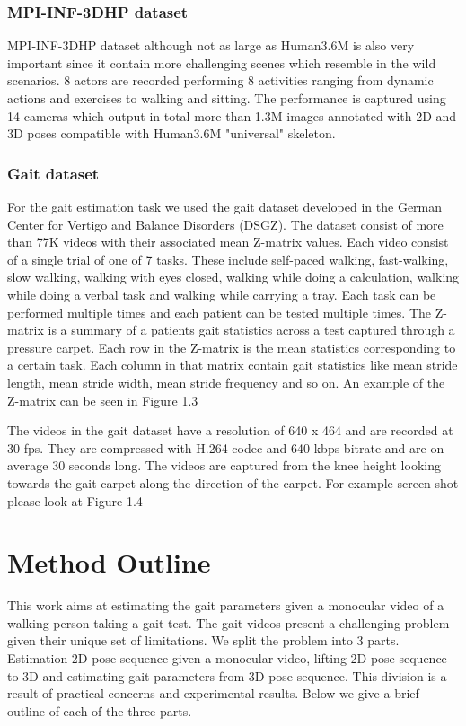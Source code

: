 \subsubsection{MPI-INF-3DHP dataset}

MPI-INF-3DHP dataset although not as large as Human3.6M is also very important since it contain more challenging scenes which resemble in the wild scenarios. 8 actors are recorded performing 8 activities ranging from dynamic actions and exercises to walking and sitting. The performance is captured using 14 cameras which output in total more than 1.3M images annotated with 2D and 3D poses compatible with Human3.6M "universal" skeleton.

\subsubsection{Gait dataset}

For the gait estimation task we used the gait dataset developed in the German Center for Vertigo and Balance Disorders (DSGZ). The dataset consist of more than 77K videos with their associated mean Z-matrix values. Each video consist of a single trial of one of 7 tasks. These include self-paced walking, fast-walking, slow walking, walking with eyes closed, walking while doing a calculation, walking while doing a verbal task and walking while carrying a tray. Each task can be performed multiple times and each patient can be tested multiple times. The Z-matrix is a summary of a patients gait statistics across a test captured through a pressure carpet. Each row in the Z-matrix is the mean statistics corresponding to a certain task. Each column in that matrix contain gait statistics like mean stride length, mean stride width, mean stride frequency and so on. An example of the Z-matrix can be seen in Figure 1.3

The videos in the gait dataset have a resolution of 640 x 464 and are recorded at 30 fps. They are compressed with H.264 codec and 640 kbps bitrate and are on average 30 seconds long. The videos are captured from the knee height looking towards the gait carpet along the direction of the carpet. For example screen-shot please look at Figure 1.4

\section{Method Outline}

This work aims at estimating the gait parameters given a monocular video of a walking person taking a gait test. The gait videos present a challenging problem given their unique set of limitations. We split the problem into 3 parts. Estimation 2D pose sequence given a monocular video, lifting 2D pose sequence to 3D and estimating gait parameters from 3D pose sequence. This division is a result of practical concerns and experimental results. Below we give a brief outline of each of the three parts.


